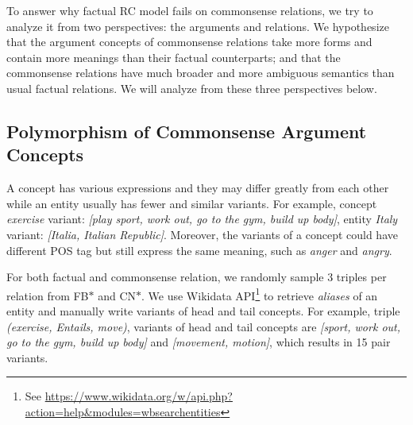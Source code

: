 \documentclass[11pt,a4paper]{article}
\newcommand{\KZ}[1]{\textcolor{blue}{Kenny: #1}}
\begin{document}
	
To answer why factual RC model fails on 
commonsense relations, we try to analyze it from two perspectives: 
the arguments and relations. We hypothesize that 
the argument concepts of commonsense relations take more forms and contain
more meanings than their factual counterparts; and that the commonsense
relations have much broader and more ambiguous semantics than usual factual
relations. We will analyze from these three perspectives below. 
	
\subsection{Polymorphism of Commonsense Argument Concepts}
\label{sec:polymorphism}
A concept has various expressions and they may differ greatly from each other while an entity usually has fewer and similar variants. 
For example, 
concept \textit{exercise} variant: \textit{[play sport, work out, go to the gym, build up body]}, entity \textit{Italy} variant: \textit{[Italia, Italian Republic]}. Moreover, the variants of a concept could have different POS tag but still express the same meaning, such as \textit{anger} and \textit{angry}. 

	
For both factual and commonsense relation, we randomly sample 3 
triples per relation from FB$*$ and CN$*$. We use Wikidata API\footnote{See \url{ https://www.wikidata.org/w/api.php?action=help&modules=wbsearchentities}} to retrieve \textit{aliases} of 
an entity and manually write variants of head and tail concepts. 
For example, triple \textit{(exercise, Entails, move)}, variants of head and 
tail concepts are \textit{[sport, work out, go to the gym, build up body]} 
and \textit{[movement, motion]}, which results in 15 pair variants. 

\end{document}
